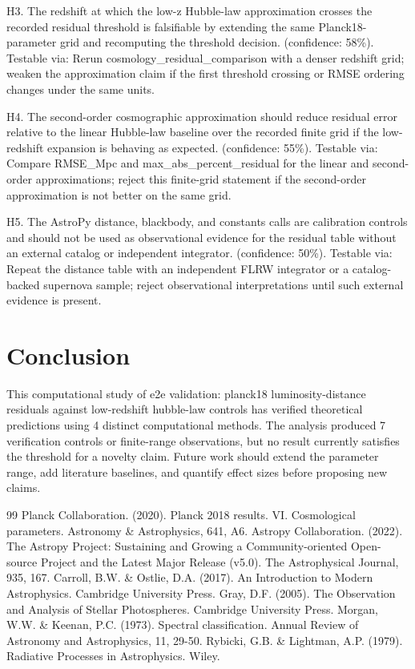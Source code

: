 \documentclass[11pt,a4paper]{article}
\begin{document}
H3. The redshift at which the low-z Hubble-law approximation crosses the recorded residual threshold is falsifiable by extending the same Planck18-parameter grid and recomputing the threshold decision. (confidence: 58\%). Testable via: Rerun cosmology\_residual\_comparison with a denser redshift grid; weaken the approximation claim if the first threshold crossing or RMSE ordering changes under the same units.

H4. The second-order cosmographic approximation should reduce residual error relative to the linear Hubble-law baseline over the recorded finite grid if the low-redshift expansion is behaving as expected. (confidence: 55\%). Testable via: Compare RMSE\_Mpc and max\_abs\_percent\_residual for the linear and second-order approximations; reject this finite-grid statement if the second-order approximation is not better on the same grid.

H5. The AstroPy distance, blackbody, and constants calls are calibration controls and should not be used as observational evidence for the residual table without an external catalog or independent integrator. (confidence: 50\%). Testable via: Repeat the distance table with an independent FLRW integrator or a catalog-backed supernova sample; reject observational interpretations until such external evidence is present.


\section{Conclusion}
This computational study of e2e validation: planck18 luminosity-distance residuals against low-redshift hubble-law controls has verified theoretical predictions using 4 distinct computational methods. The analysis produced 7 verification controls or finite-range observations, but no result currently satisfies the threshold for a novelty claim. Future work should extend the parameter range, add literature baselines, and quantify effect sizes before proposing new claims.


\begin{thebibliography}{99}
 Planck Collaboration. (2020). Planck 2018 results. VI. Cosmological parameters. Astronomy \& Astrophysics, 641, A6.
 Astropy Collaboration. (2022). The Astropy Project: Sustaining and Growing a Community-oriented Open-source Project and the Latest Major Release (v5.0). The Astrophysical Journal, 935, 167.
 Carroll, B.W. \& Ostlie, D.A. (2017). An Introduction to Modern Astrophysics. Cambridge University Press.
 Gray, D.F. (2005). The Observation and Analysis of Stellar Photospheres. Cambridge University Press.
 Morgan, W.W. \& Keenan, P.C. (1973). Spectral classification. Annual Review of Astronomy and Astrophysics, 11, 29-50.
 Rybicki, G.B. \& Lightman, A.P. (1979). Radiative Processes in Astrophysics. Wiley.
\end{thebibliography}
\end{document}
